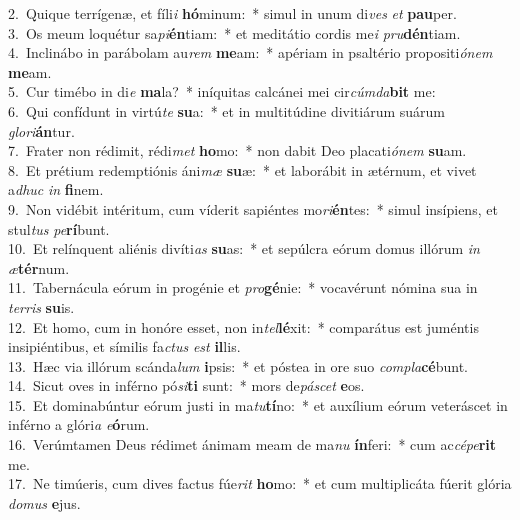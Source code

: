 {2.~}Quique terrígenæ, et fíli\textit{i} \textbf{hó}minum:~* simul in unum di\textit{ves} \textit{et} \textbf{pau}per.\\
{3.~}Os meum loquétur sa\textit{pi}\textbf{én}tiam:~* et meditátio cordis me\textit{i} \textit{pru}\textbf{dén}tiam.\\
{4.~}Inclinábo in parábolam au\textit{rem} \textbf{me}am:~* apériam in psaltério propositi\textit{ó}\textit{nem} \textbf{me}am.\\
{5.~}Cur timébo in di\textit{e} \textbf{ma}la?~* iníquitas calcánei mei cir\textit{cúm}\textit{da}\textbf{bit} me:\\
{6.~}Qui confídunt in virtú\textit{te} \textbf{su}a:~* et in multitúdine divitiárum suárum \textit{glo}\textit{ri}\textbf{án}tur.\\
{7.~}Frater non rédimit, rédi\textit{met} \textbf{ho}mo:~* non dabit Deo placati\textit{ó}\textit{nem} \textbf{su}am.\\
{8.~}Et prétium redemptiónis áni\textit{mæ} \textbf{su}æ:~* et laborábit in ætérnum, et vivet a\textit{dhuc} \textit{in} \textbf{fi}nem.\\
{9.~}Non vidébit intéritum, cum víderit sapiéntes mo\textit{ri}\textbf{én}tes:~* simul insípiens, et stul\textit{tus} \textit{pe}\textbf{rí}bunt.\\
{10.~}Et relínquent aliénis divíti\textit{as} \textbf{su}as:~* et sepúlcra eórum domus illórum \textit{in} \textit{æ}\textbf{tér}num.\\
{11.~}Tabernácula eórum in progénie et \textit{pro}\textbf{gé}nie:~* vocavérunt nómina sua in \textit{ter}\textit{ris} \textbf{su}is.\\
{12.~}Et homo, cum in honóre esset, non in\textit{tel}\textbf{lé}xit:~* comparátus est juméntis insipiéntibus, et símilis fa\textit{ctus} \textit{est} \textbf{il}lis.\\
{13.~}Hæc via illórum scánda\textit{lum} \textbf{i}psis:~* et póstea in ore suo \textit{com}\textit{pla}\textbf{cé}bunt.\\
{14.~}Sicut oves in inférno pó\textit{si}\textbf{ti} sunt:~* mors de\textit{pá}\textit{scet} \textbf{e}os.\\
{15.~}Et dominabúntur eórum justi in ma\textit{tu}\textbf{tí}no:~* et auxílium eórum veteráscet in inférno a glóri\textit{a} \textit{e}\textbf{ó}rum.\\
{16.~}Verúmtamen Deus rédimet ánimam meam de ma\textit{nu} \textbf{ín}feri:~* cum ac\textit{cé}\textit{pe}\textbf{rit} me.\\
{17.~}Ne timúeris, cum dives factus fúe\textit{rit} \textbf{ho}mo:~* et cum multiplicáta fúerit glória \textit{do}\textit{mus} \textbf{e}jus.\\
